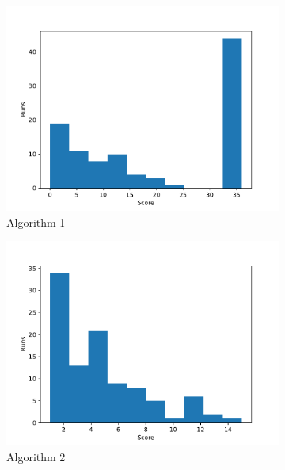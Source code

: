\documentclass[12pt,a4paper]{article}
\begin{document}
		\begin{figure}[h!]
			\begin{subfigure}{.33\textwidth}
				\centering
				\includegraphics[width=\linewidth]{../code/plots/alg1_best_dist}
				\caption{Algorithm 1}
				\label{fig:alg1_best_dist}
			\end{subfigure}
			\begin{subfigure}{.33\textwidth}
				\centering
				\includegraphics[width=\linewidth]{../code/plots/alg2_best_dist}
				\caption{Algorithm 2}
				\label{fig:alg2_best_dist}
			\end{subfigure}
			\begin{subfigure}{.33\textwidth}
				\centering

\end{subfigure}
\end{figure}
\end{document}
